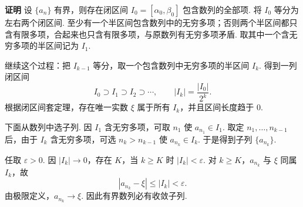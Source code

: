 \documentclass[fontset=fandol]{ctexart}
\newenvironment{custom}[1]{\par\noindent\textbf{#1}\quad}{\par\vspace{0.8em}}
\begin{document}
\begin{custom}{证明}
设 $\{a_n\}$ 有界，则存在闭区间 $I_0=[\alpha_0,\beta_0]$ 包含数列的全部项. 将 $I_0$ 等分为左右两个闭区间. 至少有一个半区间包含数列中的无穷多项；否则两个半区间都只含有限多项，合起来也只含有限多项，与原数列有无穷多项矛盾. 取其中一个含无穷多项的半区间记为 $I_1$.

继续这个过程：把 $I_{k-1}$ 等分，取一个包含数列中无穷多项的半区间 $I_k$. 得到一列闭区间
\[
I_0\supset I_1\supset I_2\supset\cdots,\qquad |I_k|=\frac{|I_0|}{2^k}.
\]
根据闭区间套定理，存在唯一实数 $\xi$ 属于所有 $I_k$，并且区间长度趋于 $0$.

下面从数列中选子列. 因 $I_1$ 含无穷多项，可取 $n_1$ 使 $a_{n_1}\in I_1$. 取定 $n_1,\ldots,n_{k-1}$ 后，由于 $I_k$ 含无穷多项，可选 $n_k>n_{k-1}$ 使 $a_{n_k}\in I_k$. 于是得到子列 $\{a_{n_k}\}$.

任取 $\varepsilon>0$. 因 $|I_k|\to0$，存在 $K$，当 $k\ge K$ 时 $|I_k|<\varepsilon$. 对 $k\ge K$，$a_{n_k}$ 与 $\xi$ 同属 $I_k$，故
\[
|a_{n_k}-\xi|\le |I_k|<\varepsilon.
\]
由极限定义，$a_{n_k}\to\xi$. 因此有界数列必有收敛子列.
\end{custom}
\end{document}
